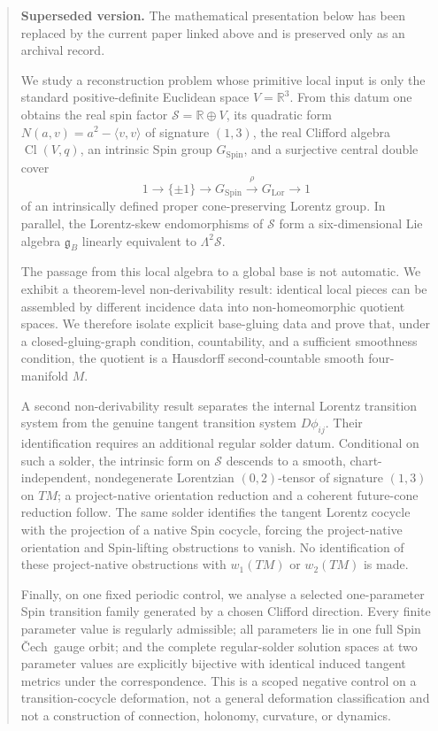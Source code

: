\documentclass[11pt,a4paper]{article}
\theoremstyle{definition}
\theoremstyle{remark}
\newcommand{\R}{\mathbb{R}}
\newcommand{\Smodel}{\mathcal{S}}
\newcommand{\Cl}{\operatorname{Cl}}
\newcommand{\SpinG}{G_{\mathrm{Spin}}}
\newcommand{\LorG}{G_{\mathrm{Lor}}}
\newcommand{\Cech}{\ifmmode\text{\v{C}ech}\else\v{C}ech\fi}
\newcommand{\gB}{\mathfrak{g}_{B}}
\begin{document}
\begin{abstract}
\textbf{Superseded version.} The mathematical presentation below has been replaced by the current paper linked above and is preserved only as an archival record.\par\medskip
We study a reconstruction problem whose primitive local input is only the
standard positive-definite Euclidean space \(V=\R^{3}\).
From this datum one obtains the real spin factor
\(\Smodel=\R\oplus V\), its quadratic form
\(N(a,v)=a^{2}-\langle v,v\rangle\) of signature \((1,3)\), the real
Clifford algebra \(\Cl(V,q)\), an intrinsic Spin group
\(\SpinG\), and a surjective central double cover
\[
   1\longrightarrow\{\pm1\}
   \longrightarrow \SpinG
   \overset{\rho}{\longrightarrow}\LorG
   \longrightarrow 1
\]
of an intrinsically defined proper cone-preserving Lorentz group.
In parallel, the Lorentz-skew endomorphisms of \(\Smodel\) form a
six-dimensional Lie algebra \(\gB\) linearly equivalent to
\(\Lambda^{2}\Smodel\).

The passage from this local algebra to a global base is not automatic.
We exhibit a theorem-level non-derivability result: identical local pieces
can be assembled by different incidence data into non-homeomorphic quotient
spaces.  We therefore isolate explicit base-gluing data and prove that,
under a closed-gluing-graph condition, countability, and a sufficient
smoothness condition, the quotient is a Hausdorff second-countable smooth
four-manifold \(M\).

A second non-derivability result separates the internal Lorentz transition
system from the genuine tangent transition system \(D\phi_{ij}\).
Their identification requires an additional regular solder datum.  Conditional
on such a solder, the intrinsic form on \(\Smodel\) descends to a smooth,
chart-independent, nondegenerate Lorentzian \((0,2)\)-tensor of signature
\((1,3)\) on \(TM\); a project-native orientation reduction and a coherent
future-cone reduction follow.  The same solder identifies the tangent
Lorentz cocycle with the projection of a native Spin cocycle, forcing the
project-native orientation and Spin-lifting obstructions to vanish.
No identification of these project-native obstructions with
\(w_{1}(TM)\) or \(w_{2}(TM)\) is made.

Finally, on one fixed periodic control, we analyse a selected one-parameter
Spin transition family generated by a chosen Clifford direction.  Every
finite parameter value is regularly admissible; all parameters lie in one
full Spin \Cech\ gauge orbit; and the complete regular-solder solution spaces
at two parameter values are explicitly bijective with identical induced
tangent metrics under the correspondence.  This is a scoped negative control
on a transition-cocycle deformation, not a general deformation
classification and not a construction of connection, holonomy, curvature,
or dynamics.
\end{abstract}
\clearpage
\end{document}
